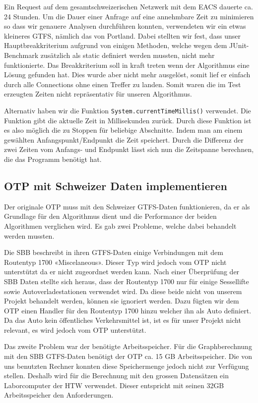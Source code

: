 Ein Request auf dem gesamtschweizerischen Netzwerk mit dem EACS dauerte ca. 24 Stunden. Um die Dauer einer Anfrage auf eine annehmbare Zeit zu minimieren so dass wir genauere Analysen durchführen konnten, verwendeten wir ein etwas kleineres GTFS, nämlich das von Portland. Dabei stellten wir fest, dass unser Hauptbreakkriterium aufgrund von einigen Methoden, welche wegen dem JUnit-Benchmark zusätzlich als static definiert werden mussten, nicht mehr funktionierte. Das Breakkriterium soll in kraft treten wenn der Algorithmus eine Lösung gefunden hat. Dies wurde aber nicht mehr ausgelöst, somit lief er einfach durch alle Connections ohne einen Treffer zu landen. Somit waren die im Test erzeugten Zeiten nicht repräsentativ für unseren Algorithmus.

Alternativ haben wir die Funktion \texttt{System.currentTimeMillis()} verwendet. Die Funktion gibt die aktuelle Zeit in Millisekunden zurück. Durch diese Funktion ist es also möglich die zu Stoppen für beliebige Abschnitte. Indem man am einem gewählten Anfangspunkt/Endpunkt die Zeit speichert. Durch die Differenz der zwei Zeiten vom Anfangs- und Endpunkt lässt sich nun die Zeitspanne berechnen, die das Programm benötigt hat. 

\subsection{OTP mit Schweizer Daten implementieren}
Der originale OTP muss mit den Schweizer GTFS-Daten funktionieren, da er als Grundlage für den Algorithmus dient und die Performance der beiden Algorithmen verglichen wird. Es gab zwei Probleme, welche dabei behandelt werden mussten.
\newline

Die SBB beschreibt in ihren GTFS-Daten einige Verbindungen mit dem Routentyp 1700 «Miscelaneous». Dieser Typ wird jedoch vom OTP nicht unterstützt da er nicht zugeordnet werden kann. Nach einer Überprüfung der SBB Daten stellte sich heraus, dass der Routentyp 1700 nur für einige Sessellifte sowie Autoverladestationen verwendet wird. Da diese beide nicht von unserem Projekt behandelt werden, können sie ignoriert werden. Dazu fügten wir dem OTP einen Handler für den Routentyp 1700 hinzu welcher ihn als Auto definiert. Da das Auto kein öffentliches Verkehrsmittel ist, ist es für unser Projekt nicht relevant, es wird jedoch vom OTP unterstützt.
\newline


Das zweite Problem war der benötigte Arbeitsspeicher. Für die Graphberechnung mit den SBB GTFS-Daten benötigt der OTP ca. 15 GB Arbeitsspeicher. Die von uns benutzten Rechner konnten diese Speichermenge jedoch nicht zur Verfügung stellen. Deshalb wird für die Berechnung mit den grossen Datensätzen ein Laborcomputer der HTW verwendet. Dieser entspricht mit seinen 32GB Arbeitsspeicher den Anforderungen.


